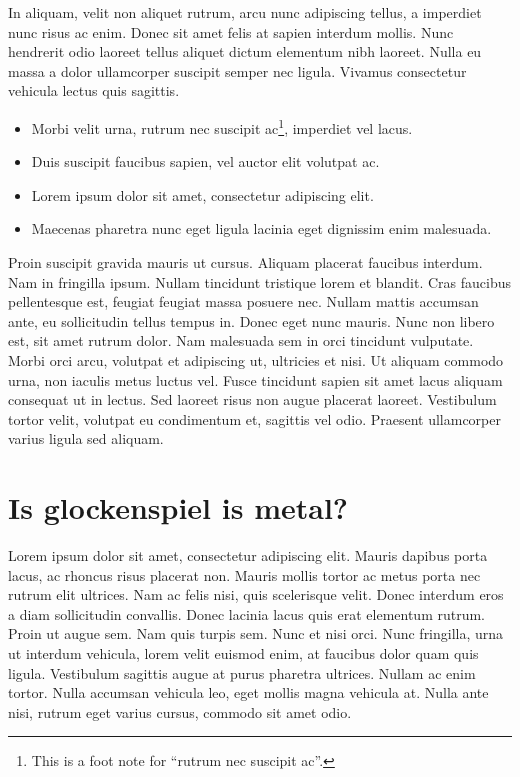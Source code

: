 \documentclass[11pt,oneside,openany]{book}
\begin{document}
In aliquam, velit non aliquet rutrum, arcu nunc adipiscing tellus, a imperdiet nunc risus ac enim. Donec sit amet felis at sapien interdum mollis. Nunc hendrerit odio laoreet tellus aliquet dictum elementum nibh laoreet. Nulla eu massa a dolor ullamcorper suscipit semper nec ligula. Vivamus consectetur vehicula lectus quis sagittis.

\begin{itemize}
\item Morbi velit urna, rutrum nec suscipit ac\footnote{This is a foot note for ``rutrum nec suscipit ac''.}, imperdiet vel lacus.
\item Duis suscipit faucibus sapien, vel auctor elit volutpat ac.
\item Lorem ipsum dolor sit amet, consectetur adipiscing elit.
\item Maecenas pharetra nunc eget ligula lacinia eget dignissim enim malesuada.
\end{itemize}

Proin suscipit gravida mauris ut cursus. Aliquam placerat faucibus interdum. Nam in fringilla ipsum. Nullam tincidunt tristique lorem et blandit. Cras faucibus pellentesque est, feugiat feugiat massa posuere nec. Nullam mattis accumsan ante, eu sollicitudin tellus tempus in. Donec eget nunc mauris. Nunc non libero est, sit amet rutrum dolor. Nam malesuada sem in orci tincidunt vulputate. Morbi orci arcu, volutpat et adipiscing ut, ultricies et nisi. Ut aliquam commodo urna, non iaculis metus luctus vel. Fusce tincidunt sapien sit amet lacus aliquam consequat ut in lectus. Sed laoreet risus non augue placerat laoreet. Vestibulum tortor velit, volutpat eu condimentum et, sagittis vel odio. Praesent ullamcorper varius ligula sed aliquam.

\section{Is glockenspiel is metal?}\hypertarget{is-glockenspiel-is-metal}{}\label{is-glockenspiel-is-metal}

Lorem ipsum dolor sit amet, consectetur adipiscing elit. Mauris dapibus porta lacus, ac rhoncus risus placerat non. Mauris mollis tortor ac metus porta nec rutrum elit ultrices. Nam ac felis nisi, quis scelerisque velit. Donec interdum eros a diam sollicitudin convallis. Donec lacinia lacus quis erat elementum rutrum. Proin ut augue sem. Nam quis turpis sem. Nunc et nisi orci. Nunc fringilla, urna ut interdum vehicula, lorem velit euismod enim, at faucibus dolor quam quis ligula. Vestibulum sagittis augue at purus pharetra ultrices. Nullam ac enim tortor. Nulla accumsan vehicula leo, eget mollis magna vehicula at. Nulla ante nisi, rutrum eget varius cursus, commodo sit amet odio.
\end{document}
